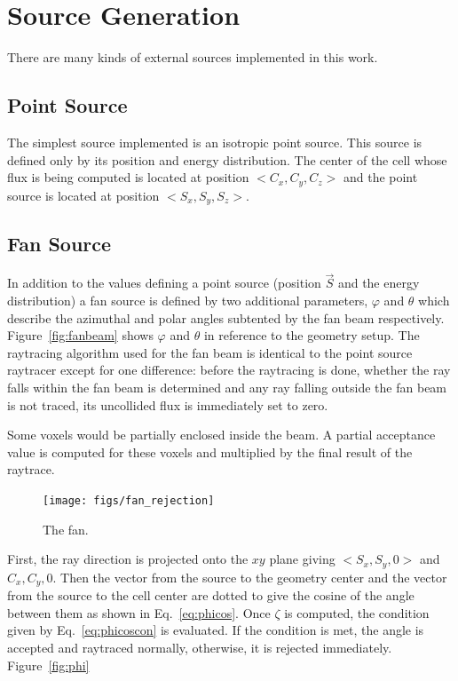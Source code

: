 \section{Source Generation}
There are many kinds of external sources implemented in this work.

\subsection{Point Source}
The simplest source implemented is an isotropic point source. This source is defined only by its position and energy distribution. The center of the cell whose flux is being computed is located at position $<C_x, C_y, C_z>$ and the point source is located at position $<S_x, S_y, S_z>$.

\subsection{Fan Source}
In addition to the values defining a point source (position $\vec{S}$ and the energy distribution) a fan source is defined by two additional parameters, $\varphi$ and $\theta$ which describe the azimuthal and polar angles subtented by the fan beam respectively. Figure~\ref{fig:fanbeam} shows $\varphi$ and $\theta$ in reference to the geometry setup. The raytracing algorithm used for the fan beam is identical to the point source raytracer except for one difference: before the raytracing is done, whether the ray falls within the fan beam is determined and any ray falling outside the fan beam is not traced, its uncollided flux is immediately set to zero.

Some voxels would be partially enclosed inside the beam. A partial acceptance value is computed for these voxels and multiplied by the final result of the raytrace.

\begin{figure}[tb]
  \begin{center}
   \texttt{[image: figs/fan\_rejection]}
  \end{center}
  \caption{The fan.}
\label{fig:fan_rejection}
\end{figure}

First, the ray direction is projected onto the $xy$ plane giving $<S_x, S_y, 0>$ and $C_x, C_y, 0$. Then the vector from the source to the geometry center and the vector from the source to the cell center are dotted to give the cosine of the angle between them as shown in Eq.~\ref{eq:phicos}. Once $\zeta$ is computed, the condition given by Eq.~\ref{eq:phicoscon} is evaluated. If the condition is met, the angle is accepted and raytraced normally, otherwise, it is rejected immediately. Figure~\ref{fig:phi}

